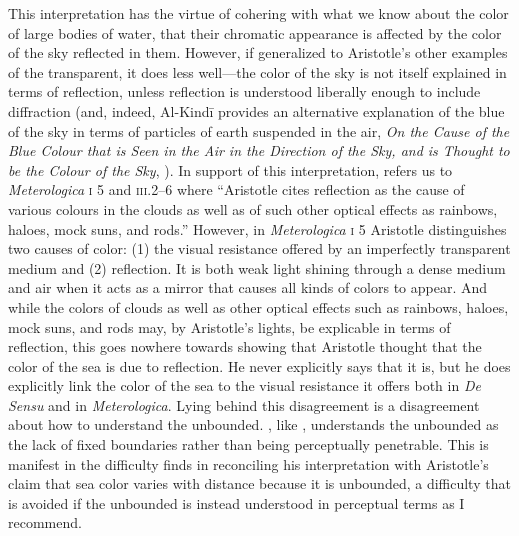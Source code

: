 This interpretation has the virtue of cohering with what we know about the color of large bodies of water, that their chromatic appearance is affected by the color of the sky reflected in them. However, if generalized to Aristotle's other examples of the transparent, it does less well---the color of the sky is not itself explained in terms of reflection, unless reflection is understood liberally enough to include diffraction (and, indeed, Al-Kind\={i} provides an alternative explanation of the blue of the sky in terms of particles of earth suspended in the air, \emph{On the Cause of the Blue Colour that is Seen in the Air in the Direction of the Sky, and is Thought to be the Colour of the Sky}, \citealt[139--143]{Adamson:2012fk}). In support of this interpretation, \citet[130]{Sorabji:2004fk} refers us to \emph{Meterologica} \textsc{i} 5 and \textsc{iii}.2--6 where ``Aristotle cites reflection as the cause of various colours in the clouds as well as of such other optical effects as rainbows, haloes, mock suns, and rods.'' However, in \emph{Meterologica} \textsc{i} 5 Aristotle distinguishes two causes of color: (1) the visual resistance offered by an imperfectly transparent medium and (2) reflection. It is both weak light shining through a dense medium and air when it acts as a mirror that causes all kinds of colors to appear. And while the colors of clouds as well as other optical effects such as rainbows, haloes, mock suns, and rods may, by Aristotle's lights, be explicable in terms of reflection, this goes nowhere towards showing that Aristotle thought that the color of the sea is due to reflection. He never explicitly says that it is, but he does explicitly link the color of the sea to the visual resistance it offers both in \emph{De Sensu} and in \emph{Meterologica}. Lying behind this disagreement is a disagreement about how to understand the unbounded. \citet{Sorabji:2004fk}, like \citet{Broackes:1999uq}, understands the unbounded as the lack of fixed boundaries rather than being perceptually penetrable. This is manifest in the difficulty \citet[131]{Sorabji:2004fk} finds in reconciling his interpretation with Aristotle's claim that sea color varies with distance because it is unbounded, a difficulty that is avoided if the unbounded is instead understood in perceptual terms as I recommend.

